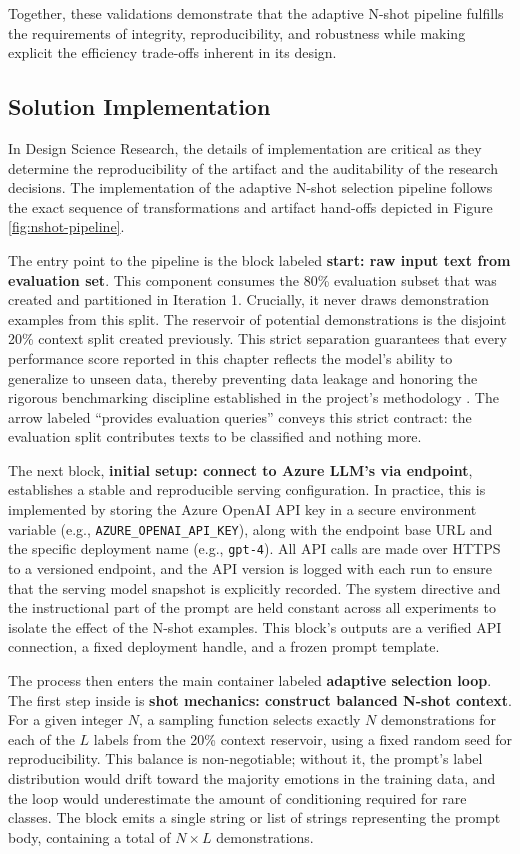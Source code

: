 Together, these validations demonstrate that the adaptive N-shot pipeline fulfills the requirements of integrity, reproducibility, and robustness while making explicit the efficiency trade-offs inherent in its design.  

\subsection{Solution Implementation}

In Design Science Research, the details of implementation are critical as they determine the reproducibility of the artifact and the auditability of the research decisions. The implementation of the adaptive N-shot selection pipeline follows the exact sequence of transformations and artifact hand-offs depicted in Figure \ref{fig:nshot-pipeline}.

The entry point to the pipeline is the block labeled \textbf{start: raw input text from evaluation set}. This component consumes the 80\% evaluation subset that was created and partitioned in Iteration 1. Crucially, it never draws demonstration examples from this split. The reservoir of potential demonstrations is the disjoint 20\% context split created previously. This strict separation guarantees that every performance score reported in this chapter reflects the model's ability to generalize to unseen data, thereby preventing data leakage and honoring the rigorous benchmarking discipline established in the project's methodology \cite{demszky2020goemotions}. The arrow labeled ``provides evaluation queries'' conveys this strict contract: the evaluation split contributes texts to be classified and nothing more.

The next block, \textbf{initial setup: connect to Azure LLM's via endpoint}, establishes a stable and reproducible serving configuration. In practice, this is implemented by storing the Azure OpenAI API key in a secure environment variable (e.g., \texttt{AZURE\_OPENAI\_API\_KEY}), along with the endpoint base URL and the specific deployment name (e.g., \texttt{gpt-4}). All API calls are made over HTTPS to a versioned endpoint, and the API version is logged with each run to ensure that the serving model snapshot is explicitly recorded. The system directive and the instructional part of the prompt are held constant across all experiments to isolate the effect of the N-shot examples. This block's outputs are a verified API connection, a fixed deployment handle, and a frozen prompt template.

The process then enters the main container labeled \textbf{adaptive selection loop}. The first step inside is \textbf{shot mechanics: construct balanced N-shot context}. For a given integer $N$, a sampling function selects exactly $N$ demonstrations for each of the $L$ labels from the 20\% context reservoir, using a fixed random seed for reproducibility. This balance is non-negotiable; without it, the prompt's label distribution would drift toward the majority emotions in the training data, and the loop would underestimate the amount of conditioning required for rare classes. The block emits a single string or list of strings representing the prompt body, containing a total of $N \times L$ demonstrations.

